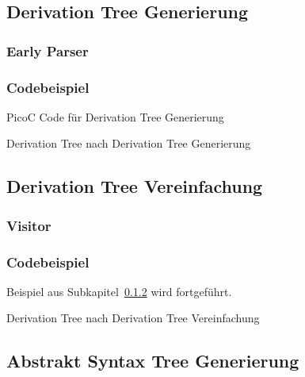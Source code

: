 \subsection{Derivation Tree Generierung}
\subsubsection{Early Parser}
\subsubsection{Codebeispiel}
\label{sec:derivation_tree_generierung}
\begin{code}
  \centering
  \caption{PicoC Code für Derivation Tree Generierung}
  \label{code:picoc_code_für_derivation_tree_generierung}
\end{code}

\begin{code}
  \centering
  \caption{Derivation Tree nach Derivation Tree Generierung}
  \label{code:derivation_tree_nach_derivation_tree_generierung}
\end{code}

\subsection{Derivation Tree Vereinfachung}
\subsubsection{Visitor}
\subsubsection{Codebeispiel}

Beispiel aus Subkapitel~\ref{sec:derivation_tree_generierung} wird fortgeführt.

\begin{code}
  \centering
  \caption{Derivation Tree nach Derivation Tree Vereinfachung}
  \label{code:picoc_code_nach_derivation_tree_vereinfachung}
\end{code}

\subsection{Abstrakt Syntax Tree Generierung}
